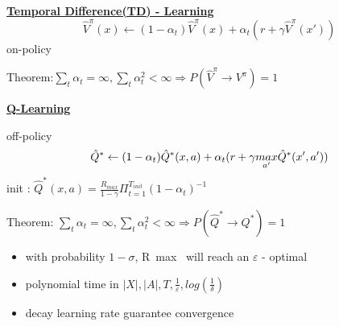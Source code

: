 \documentclass[landscape,a0paper,fontscale=0.285]{baposter} %
\newcommand{\compresslist}{ %
\setlength{\itemsep}{1pt}
\setlength{\parskip}{0pt}
\setlength{\parsep}{0pt}
}
\begin{document}
\begin{poster}
{\colorbox[HTML]{CCFFFF}{}


\underline{\textbf{Temporal Difference(TD) - Learning}}
\vspace{-0.2cm}
$$
\hat V^\pi (x)\leftarrow (1-\alpha_t)\hat V^\pi (x) + \alpha_t(r+\gamma\hat V^\pi (x'))
$$
on-policy 

Theorem:$
\sum_t\alpha_t=\infty,\sum_t\alpha_t^2 < \infty \Rightarrow P(\hat V^\pi\rightarrow  V^\pi) = 1
$

\underline{\textbf{Q-Learning}}


off-policy\vspace{-0.2cm}
$$\vspace{-0.3cm}
\hat Q^* \leftarrow (1-\alpha_t)\hat Q^*(x,a) + \alpha_t(r+\gamma \underset{a'}{max}\hat Q^*(x',a'))
$$
init : $\hat Q^*(x,a) = \frac{R_{max}}{1-\gamma}\Pi_{t=1}^{T_{init}}(1-\alpha_t)^{-1}$

Theorem: $\sum_t\alpha_t=\infty,\sum_t\alpha_t^2 < \infty \Rightarrow P(\hat Q^*\rightarrow  Q^*) = 1$  
\begin{itemize}\compresslist
    \item with probability $1-\sigma$,  R~max~ will reach an $\varepsilon$ - optimal
    \item polynomial time in $|X|, |A|, T,\frac{1}{\varepsilon},log(\frac{1}{\delta})$
    \item decay learning rate guarantee convergence
\end{itemize}
}


\end{poster}
\end{document}
